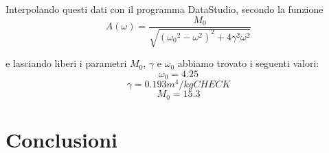 \documentclass[a4paper,10pt]{report}
\begin{document}
Interpolando questi dati con il programma DataStudio, secondo la funzione
$$ A(\omega) = \frac{M_0}{\sqrt{ ({\omega_0}^2-\omega^2)^2 + 4\gamma^2\omega^2}} $$

e lasciando liberi i parametri $M_0$, $\gamma$ e $\omega_0$ abbiamo trovato i seguenti valori:
$$ \omega_0 = 4.25 $$
$$ \gamma = 0.193 m^4/kg  CHECK $$
$$ M_0 = 15.3 $$

\section{Conclusioni}
\end{document}
